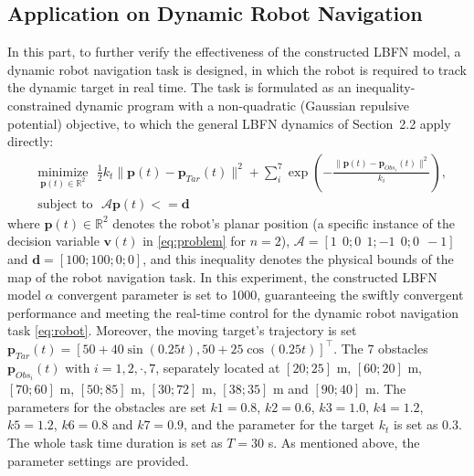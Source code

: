 \documentclass[fleqn,10pt]{wlscirep}
\begin{document}
\subsection{Application on Dynamic Robot Navigation}
In this part, to further verify the effectiveness of the constructed LBFN model, a dynamic robot navigation task is designed, in which the robot is required to track the dynamic target in real time. The task is formulated as an inequality-constrained dynamic program with a non-quadratic (Gaussian repulsive potential) objective, to which the general LBFN dynamics of Section~2.2 apply directly:
\begin{equation}\label{eq:robot}
\begin{aligned}
& \underset{\bm{p}(t) \in \mathbb{R}^2}{\text{minimize}}~~~ \frac{1}{2}k_t\|\bm{p}(t)-\bm{p}_{Tar}(t)\|^2+\sum_i^7\exp\left(-\frac{\|\bm{p}(t)-\bm{p}_{Obs_i}(t)\|^2}{k_i}\right),\\
&\text{subject to} ~~~\mathcal{A}\bm{p}(t)<=\bm{d}
\end{aligned}
\end{equation}
where $\bm{p}(t)\in\mathbb{R}^2$ denotes the robot's planar position (a specific instance of the decision variable $\bm{v}(t)$ in \eqref{eq:problem} for $n=2$), $\mathcal{A}=[1~~0;0~~1;-1~~0;0~~-1]$ and $\bm{d}=[100;100;0;0]$, and this inequality denotes the physical bounds of the map of the robot navigation task. In this experiment, the constructed LBFN model $\alpha$ convergent parameter is set to 1000, guaranteeing the swiftly convergent performance and meeting the real-time control for the dynamic robot navigation task \eqref{eq:robot}. Moreover, the moving target's trajectory is set $\bm{p}_{Tar}(t)=[50+40\sin(0.25t), 50+25\cos(0.25t)]^{\top}$. The 7 obstacles $\bm{p}_{Obs_i}(t)$ with $i=1,2,\cdot,7$, separately located at $[20;25]$ m, $[60;20]$ m, $[70;60]$ m, $[50;85]$ m, $[30;72]$ m, $[38;35]$ m and $[90;40]$ m. The parameters for the obstacles are set $k1=0.8$, $k2=0.6$, $k3=1.0$, $k4=1.2$, $k5=1.2$, $k6=0.8$ and $k7=0.9$, and the parameter for the target $k_t$ is set as 0.3. The whole task time duration is set as $T=30$ s. As mentioned above, the parameter settings are provided.
\end{document}
